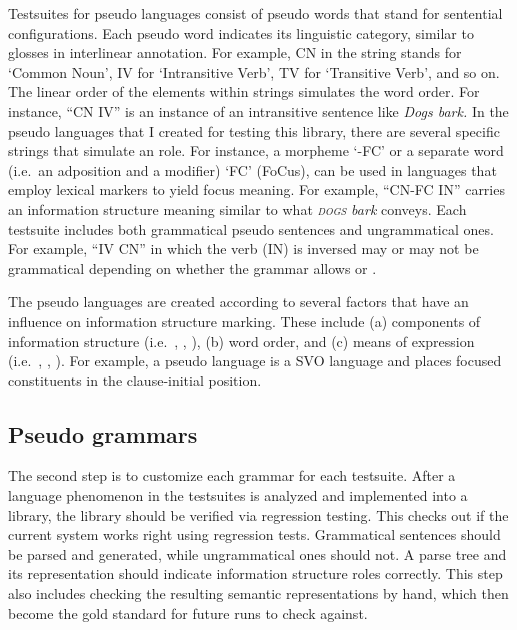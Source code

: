 Testsuites for pseudo languages consist of pseudo words that stand for
sentential configurations. Each pseudo word indicates its linguistic
category, similar to glosses in interlinear annotation. For example,
CN in the string stands for `Common Noun', IV for `Intransitive Verb',
TV for `Transitive Verb', and so on. The linear order of the elements
within strings simulates the word order. For instance, ``CN IV'' is an
instance of an intransitive sentence like \textit{Dogs bark.}  In the
pseudo languages that I created for testing this library, there are
several specific strings that simulate an 
role. For instance, a morpheme `-FC' or a separate word
(i.e.\ an adposition and a modifier) `FC' (FoCus), can be used in
languages that employ lexical markers to yield focus meaning. For
example, ``CN-FC IN'' carries an information structure meaning similar
to what \textit{\textsc{dogs} bark} conveys.  Each testsuite includes
both grammatical pseudo sentences and ungrammatical ones. For example,
``IV CN'' in which the verb (IN) is inversed may or may not be
grammatical depending on whether the grammar allows 
or  .


The pseudo languages are created according to several factors that
have an influence on information structure marking. These include (a)
components of information structure
(i.e.\ , , ),
(b) word order, and (c) means of expression (i.e.\ , 
, ).
For example, a pseudo language
 is a SVO language and places focused
constituents in the clause-initial position.




\subsection{Pseudo grammars}
\label{12:ssec:grammars}


The second step is to customize each grammar for each
testsuite. After a language phenomenon in the
testsuites is analyzed and implemented into a library, the library
should be verified via regression testing.  This checks out if the
current system works right using regression tests. Grammatical
sentences should be parsed and generated, while ungrammatical ones
should not.  A parse tree and its 
 representation should indicate
information structure roles correctly.  This step also includes
checking the resulting semantic representations by hand, which then
become the gold standard for future runs to check
against.




